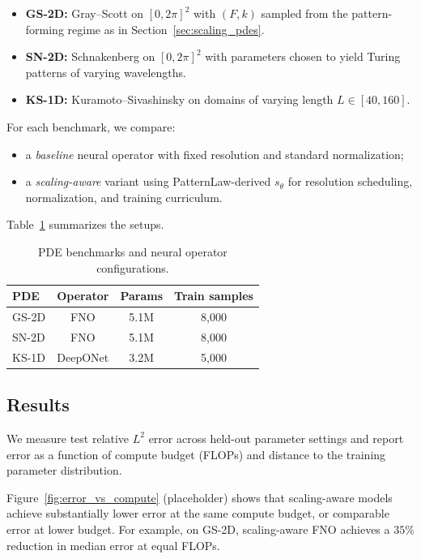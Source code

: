 \documentclass{article}
\theoremstyle{plain}
\theoremstyle{definition}
\theoremstyle{remark}
\begin{document}
\begin{itemize}
    \item \textbf{GS-2D:} Gray--Scott on $[0,2\pi]^2$ with $(F,k)$ sampled from the pattern-forming regime as in Section~\ref{sec:scaling_pdes}.
    \item \textbf{SN-2D:} Schnakenberg on $[0,2\pi]^2$ with parameters chosen to yield Turing patterns of varying wavelengths.
    \item \textbf{KS-1D:} Kuramoto--Sivashinsky on domains of varying length $L\in[40,160]$.
\end{itemize}

For each benchmark, we compare:

\begin{itemize}
    \item a \emph{baseline} neural operator with fixed resolution and standard normalization;
    \item a \emph{scaling-aware} variant using PatternLaw-derived $s_\theta$ for resolution scheduling, normalization, and training curriculum.
\end{itemize}

Table~\ref{tab:benchmarks} summarizes the setups.

\begin{table}[t]
    \centering
    \caption{PDE benchmarks and neural operator configurations.}
    \label{tab:benchmarks}
    \begin{tabular}{lccc}
        \toprule
        PDE & Operator & Params & Train samples \\
        \midrule
        GS-2D & FNO & 5.1M & 8{,}000 \\
        SN-2D & FNO & 5.1M & 8{,}000 \\
        KS-1D & DeepONet & 3.2M & 5{,}000 \\
        \bottomrule
    \end{tabular}
\end{table}

\subsection{Results}

We measure test relative $L^2$ error across held-out parameter settings and report error as a function of compute budget (FLOPs) and distance to the training parameter distribution.

Figure~\ref{fig:error_vs_compute} (placeholder) shows that scaling-aware models achieve substantially lower error at the same compute budget, or comparable error at lower budget. For example, on GS-2D, scaling-aware FNO achieves a $35\%$ reduction in median error at equal FLOPs.
\end{document}
